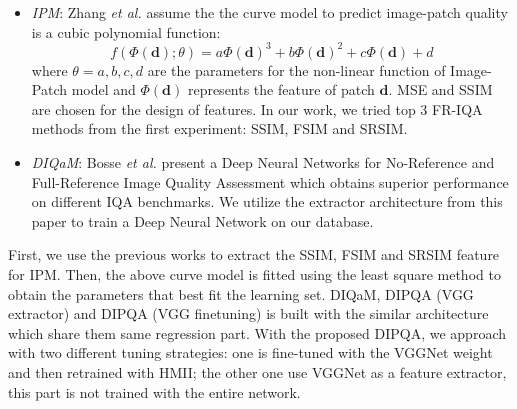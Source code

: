 \begin{itemize}
  \item \textit{IPM}: Zhang \textit{et al.}\cite{Zhang2019} assume the the curve model to predict image-patch quality is a cubic polynomial function:
  $$f(\Phi(\textbf{d});\theta) = a\Phi(\textbf{d})^{3} + b\Phi(\textbf{d})^{2} + c\Phi(\textbf{d}) + d$$
  where $\theta = {a, b, c, d}$ are the parameters for the non-linear function of Image-Patch model and $\Phi(\textbf{d})$ represents the feature of patch $\textbf{d}$. MSE and SSIM are chosen for the design of features. In our work, we tried top 3 FR-IQA methods from the first experiment: SSIM, FSIM and SRSIM.  
  
  \item \textit{DIQaM}: Bosse \textit{et al.}\cite{Bosse2018} present a Deep Neural Networks for No-Reference and Full-Reference Image Quality Assessment which obtains superior performance on different IQA benchmarks. We utilize the extractor architecture from this paper to train a Deep Neural Network on our database.
\end{itemize}

First, we use the previous works to extract the SSIM, FSIM and SRSIM feature for IPM. Then, the above curve model is fitted using the least square method to obtain the parameters that best fit the learning set. DIQaM, DIPQA (VGG extractor) and DIPQA (VGG finetuning) is built with the similar architecture which share them same regression part. With the proposed DIPQA, we approach with two different tuning strategies: one is fine-tuned with the VGGNet weight and then retrained with HMII; the other one use VGGNet as a feature extractor, this part is not trained with the entire network.
  
